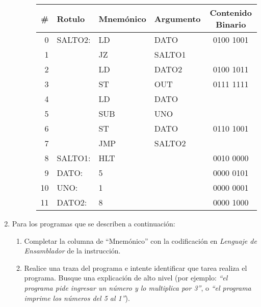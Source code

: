 \documentclass[12pt]{article}
\begin{document}
\begin{enumerate}
\begin{enumerate}
\begin{enumerate}
\begin{tabular}{|r||l|l|l||c|}
                    \hline

                    \textbf{\#} & \textbf{Rotulo} & \textbf{Mnemónico} &
                    \textbf{Argumento} & \textbf{Contenido Binario}\\
                    \hline
                    \hline

                    0 & SALTO2: & LD & DATO & 0100 1001\\ \hline
                    1 & & JZ & SALTO1 & \\ \hline
                    2 & & LD & DATO2 & 0100 1011\\ \hline
                    3 & & ST & OUT & 0111 1111\\ \hline
                    4 & & LD & DATO & \\ \hline
                    5 & & SUB & UNO & \\ \hline
                    6 & & ST & DATO & 0110 1001\\ \hline
                    7 & & JMP & SALTO2 & \\ \hline
                    8 & SALTO1: & HLT & & 0010 0000\\ \hline
                    9 & DATO: & 5 & & 0000 0101\\ \hline
                    10 & UNO: & 1 & & 0000 0001\\ \hline
                    11 & DATO2: & 8 & & 0000 1000\\ \hline

                \end{tabular}

            \end{enumerate}
        \end{enumerate}

    \item Para los programas que se describen a continuación:

        \begin{enumerate}

            \item Completar la columna de ``Mnemónico'' con la codificación en
                \emph{Lenguaje de Ensamblador} de la instrucción.

            \item Realice una traza del programa e intente identificar que
                tarea realiza el programa. Busque una explicación de alto
                nivel (por ejemplo: \emph{``el programa pide ingresar un número y lo
                multiplica por 3''}, o \emph{``el programa imprime los números del 5
                al 1''}).


\end{enumerate}
\end{enumerate}
\end{document}
